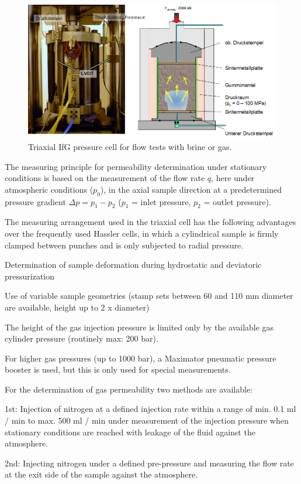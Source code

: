 \begin{figure}[!ht]
\centering
\includegraphics[width=1\textwidth]{./figures/ifg-lab-photo4.png}
\caption{Triaxial IfG pressure cell for flow tests with brine or gas.}
\label{fig:ifglabph4}
\end{figure}

The measuring principle for permeability determination under stationary conditions is based on the measurement of the flow rate $q$, here under atmospheric conditions ($p_0$), in the axial sample direction at a predetermined pressure gradient $\Delta p = p_1 - p_2$ ($p_1$ = inlet pressure, $p_2$ = outlet pressure).

The measuring arrangement used in the triaxial cell has the following advantages over the frequently used Hassler cells, in which a cylindrical sample is firmly clamped between punches and is only subjected to radial pressure.

\begin{list}{-}{\leftmargin=1em \itemindent=0em \itemsep=0em}
\item Determination of sample deformation during hydrostatic and deviatoric pressurization
\item Use of variable sample geometries (stamp sets between 60 and 110 mm diameter are available, height up to 2 x diameter)
\item The height of the gas injection pressure is limited only by the available gas cylinder pressure (routinely max: 200 bar).
\item For higher gas pressures (up to 1000 bar), a Maximator pneumatic pressure booster is used, but this is only used for special measurements.
\end{list}

For the determination of gas permeability two methods are available:
\begin{list}{-}{\leftmargin=1em \itemindent=0em \itemsep=0.1em}
\item 1st: Injection of nitrogen at a defined injection rate within a range of min. 0.1 ml / min to max. 500 ml / min under 
measurement of the injection pressure when stationary conditions are reached with leakage of the fluid against the atmosphere.
\item 2nd: Injecting nitrogen under a defined pre-pressure and measuring the flow rate at the exit side of the sample against the atmosphere.
\end{list}

